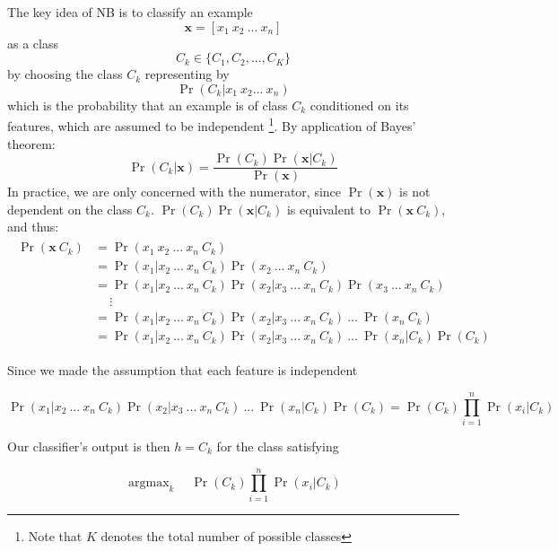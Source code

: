 \documentclass[12pt,a4paper,twoside,openright]{report}
\renewcommand{\vec}[1]{\mathbf{#1}}
\DeclareMathOperator*{\argmax}{argmax}
\begin{document}
The key idea of NB is to classify an example 
\begin{equation}
\vec{x} = [x_1\ x_2\ ...\ x_n]
\end{equation}
as a class 
\begin{equation}
C_k \in \{C_1, C_2, ..., C_K\}
\end{equation}
by choosing the class $C_k$ representing by
\begin{equation}
\Pr(C_k | x_1\ x_2 ...\ x_n)
\end{equation}
which is the probability
that an example is of class $C_k$ conditioned on its features, which are assumed to be independent
\footnote{Note that $K$ denotes the total number of possible classes}. By application of
Bayes' theorem:
\begin{equation}
\Pr(C_k | \vec{x}) = \frac{\Pr(C_k)\Pr(\vec{x}|C_k)}{\Pr(\vec{x})}
\end{equation}
In practice, we are only concerned with the numerator, since $\Pr(\vec{x})$ is not dependent
on the class $C_k$. $\Pr(C_k)\Pr(\vec{x}|C_k)$ is equivalent to $\Pr(\vec{x}\ C_k)$, and thus:
\begin{align}
\begin{split}
\Pr(\vec{x}\ C_k) &= \Pr(x_1\ x_2\ ...\ x_n\ C_k)\\
&= \Pr(x_1 | x_2\ ...\ x_n\ C_k)\Pr(x_2\ ...\ x_n\ C_k)\\
&= \Pr(x_1 | x_2\ ...\ x_n\ C_k)\Pr(x_2 | x_3\ ...\ x_n\ C_k)\Pr(x_3\ ...\ x_n\ C_k)\\
& \quad\ \vdots\\
&= \Pr(x_1 | x_2\ ...\ x_n\ C_k)\Pr(x_2 | x_3\ ...\ x_n\ C_k)\ ...\ \Pr(x_n\ C_k)\\
&= \Pr(x_1 | x_2\ ...\ x_n\ C_k)\Pr(x_2 | x_3\ ...\ x_n\ C_k)\ ...\ \Pr(x_n | C_k)\Pr(C_k)
\end{split}
\end{align}

Since we made the assumption that each feature is independent

\begin{equation}
\Pr(x_1 | x_2\ ...\ x_n\ C_k)\Pr(x_2 | x_3\ ...\ x_n\ C_k)\ ...\ \Pr(x_n | C_k)\Pr(C_k)
= \Pr(C_k)\prod_{i=1}^n \Pr(x_i | C_k)
\end{equation}

Our classifier's output is then $h = C_k$ for the class satisfying

\begin{equation}
\argmax_k\quad \Pr(C_k)\prod_{i=1}^n \Pr(x_i | C_k)
\end{equation}
\end{document}
